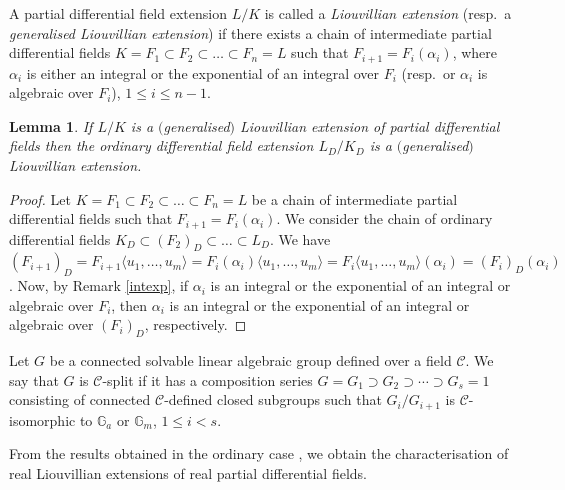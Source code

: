 \documentclass[pdftex]{sigma}%
\numberwithin{equation}{section}
\newtheorem{Lemma}[Theorem]{Lemma}
\newcommand{\G}{\mathbb{G}}
\begin{document}
\begin{Definition} A partial differential field extension $L/K$ is called a \emph{Liouvillian extension} (resp.\ a \emph{generalised Liouvillian extension}) if there exists a chain of intermediate partial differential fields $K=F_1 \subset F_2 \subset \dots \subset F_n =L$ such that $F_{i+1}=F_i(\alpha_i)$, where $\alpha_i$ is either an integral or the exponential of an integral over $F_i$ (resp.\ or $\alpha_i$ is algebraic over $F_i$), $1\leq i \leq n-1$.
\end{Definition}

\begin{Lemma}\label{Liou}
 If $L/K$ is a $($generalised$)$ Liouvillian extension of partial differential fields then the ordinary differential field extension $L_D/K_D$ is a $($generalised$)$ Liouvillian extension.
\end{Lemma}

\begin{proof}
 Let $K=F_1 \subset F_2 \subset \dots \subset F_n =L$ be a chain of intermediate partial differential fields such that $F_{i+1}=F_i(\alpha_i)$.
 We consider the chain of ordinary differential fields $K_D \subset (F_2)_D \subset \dots \subset L_D$. We have $(F_{i+1})_D=F_{i+1}\langle u_1,\dots,u_m \rangle=F_i(\alpha_i)\langle u_1,\dots,u_m \rangle=F_i\langle u_1,\dots,u_m \rangle(\alpha_i)=(F_i)_D(\alpha_i)$. Now, by Remark \ref{intexp}, if $\alpha_i$ is an integral or the exponential of an integral or algebraic over $F_i$, then $\alpha_i$ is an integral or the exponential of an integral or algebraic over $(F_i)_D$, respectively.
\end{proof}

\begin{Definition} Let $G$ be a connected solvable linear algebraic group defined over a field $\mathcal{C}$. We say that $G$ is $\mathcal{C}$-split if it has a composition series $G=G_1 \supset G_2 \supset \cdots \supset G_s = 1$ consisting of connected $\mathcal{C}$-defined closed subgroups such that $G_i/G_{i+1}$ is $\mathcal{C}$-isomorphic to $\G_a$ or $\G_m$, $1\leq i <s$.
\end{Definition}

From the results obtained in the ordinary case \cite[Section~3, Theorems~17 and~18]{CH}, we obtain the characterisation of real
Liouvillian extensions of real partial differential fields.
\end{document}

